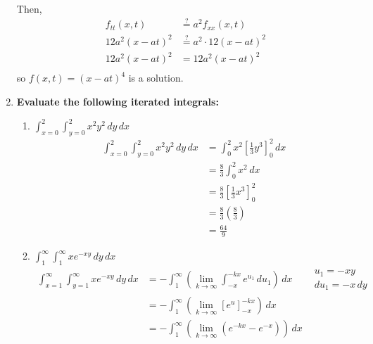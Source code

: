 \documentclass[11pt]{article}
\begin{document}
\begin{enumerate}[label=\textbf{\arabic*.}]
{\begin{enumerate}[label=\textbf{(\alph*)}]
{\begin{align*}
                    \end{align*}
                    Then,
                    \begin{align*}
                        f_{tt}(x,t)&\stackrel{?}{=}a^2f_{xx}(x,t) \\
                        12a^2(x-at)^2&\stackrel{?}{=}a^2\cdot12(x-at)^2 \\
                        12a^2(x-at)^2&=12a^2(x-at)^2 \\
                    \end{align*}
                    so \(f(x,t)=(x-at)^4\) is a solution.
                }
            \end{enumerate}
        }
        \item{
            \textbf{Evaluate the following iterated integrals:}
            \begin{enumerate}[label=\textbf{(\alph*)}]
                \item{
                    \textbf{\boldmath \(\int_{x=0}^2\int_{y=0}^2x^2y^2\,dy\,dx\)}
                    \begin{align*}
                        \int_{x=0}^2\int_{y=0}^2x^2y^2\,dy\,dx&=\int_0^2x^2\left[\frac{1}{3}y^3\right]_0^2\,dx \\
                        &=\frac{8}{3}\int_0^2x^2\,dx \\
                        &=\frac{8}{3}\left[\frac{1}{3}x^3\right]_0^2 \\
                        &=\frac{8}{3}\left(\frac{8}{3}\right) \\
                        &=\frac{64}{9}
                    \end{align*}
                }
                \item{
                    \textbf{\boldmath \(\int_1^\infty\int_1^\infty xe^{-xy}\,dy\,dx\)}
                    \begin{align*}
                        \int_{x=1}^\infty\int_{y=1}^\infty xe^{-xy}\,dy\,dx&=-\int_1^\infty\left(\lim_{k\to\infty}\int_{-x}^{-kx}e^{u_1}\,du_1\right)\,dx & \begin{matrix}u_1=-xy \\ du_1=-x\,dy\end{matrix} \\
                        &=-\int_1^\infty\left(\lim_{k\to\infty}[e^u]_{-x}^{-kx}\right)\,dx \\
                        &=-\int_1^\infty\left(\lim_{k\to\infty}(e^{-kx}-e^{-x})\right)\,dx \\

\end{align*}}
\end{enumerate}}
\end{enumerate}
\end{document}
